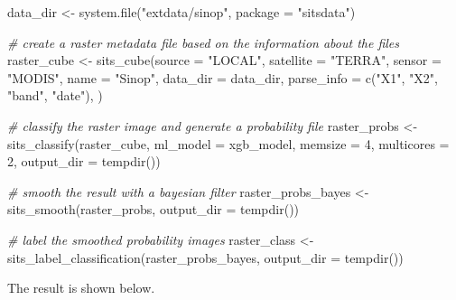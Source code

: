 \documentclass[a4paper,]{tufte-book}
\newenvironment{Shaded}{}{}
\newcommand{\AttributeTok}[1]{\textcolor[rgb]{0.49,0.56,0.16}{#1}}
\newcommand{\CommentTok}[1]{\textcolor[rgb]{0.38,0.63,0.69}{\textit{#1}}}
\newcommand{\DecValTok}[1]{\textcolor[rgb]{0.25,0.63,0.44}{#1}}
\newcommand{\FunctionTok}[1]{\textcolor[rgb]{0.02,0.16,0.49}{#1}}
\newcommand{\NormalTok}[1]{#1}
\newcommand{\OtherTok}[1]{\textcolor[rgb]{0.00,0.44,0.13}{#1}}
\newcommand{\StringTok}[1]{\textcolor[rgb]{0.25,0.44,0.63}{#1}}
\begin{document}
\begin{Shaded}
\begin{Highlighting}[]
\NormalTok{data\_dir }\OtherTok{\textless{}{-}} \FunctionTok{system.file}\NormalTok{(}\StringTok{"extdata/sinop"}\NormalTok{, }\AttributeTok{package =} \StringTok{"sitsdata"}\NormalTok{)}

\CommentTok{\# create a raster metadata file based on the information about the files}
\NormalTok{raster\_cube }\OtherTok{\textless{}{-}} \FunctionTok{sits\_cube}\NormalTok{(}\AttributeTok{source =} \StringTok{"LOCAL"}\NormalTok{,}
                   \AttributeTok{satellite =} \StringTok{"TERRA"}\NormalTok{,}
                   \AttributeTok{sensor  =} \StringTok{"MODIS"}\NormalTok{,}
                   \AttributeTok{name =} \StringTok{"Sinop"}\NormalTok{,}
                   \AttributeTok{data\_dir =}\NormalTok{ data\_dir,}
                   \AttributeTok{parse\_info =} \FunctionTok{c}\NormalTok{(}\StringTok{"X1"}\NormalTok{, }\StringTok{"X2"}\NormalTok{, }\StringTok{"band"}\NormalTok{, }\StringTok{"date"}\NormalTok{),}
\NormalTok{)}

\CommentTok{\# classify the raster image and generate a probability file}
\NormalTok{raster\_probs }\OtherTok{\textless{}{-}} \FunctionTok{sits\_classify}\NormalTok{(raster\_cube, }\AttributeTok{ml\_model =}\NormalTok{ xgb\_model, }
                              \AttributeTok{memsize =} \DecValTok{4}\NormalTok{, }\AttributeTok{multicores =} \DecValTok{2}\NormalTok{, }
                              \AttributeTok{output\_dir =} \FunctionTok{tempdir}\NormalTok{())}

\CommentTok{\# smooth the result with a bayesian filter}
\NormalTok{raster\_probs\_bayes }\OtherTok{\textless{}{-}} \FunctionTok{sits\_smooth}\NormalTok{(raster\_probs, }\AttributeTok{output\_dir =} \FunctionTok{tempdir}\NormalTok{())}

\CommentTok{\# label the smoothed probability images}
\NormalTok{raster\_class }\OtherTok{\textless{}{-}} \FunctionTok{sits\_label\_classification}\NormalTok{(raster\_probs\_bayes, }\AttributeTok{output\_dir =} \FunctionTok{tempdir}\NormalTok{())}
\end{Highlighting}
\end{Shaded}

The result is shown below.
\end{document}
